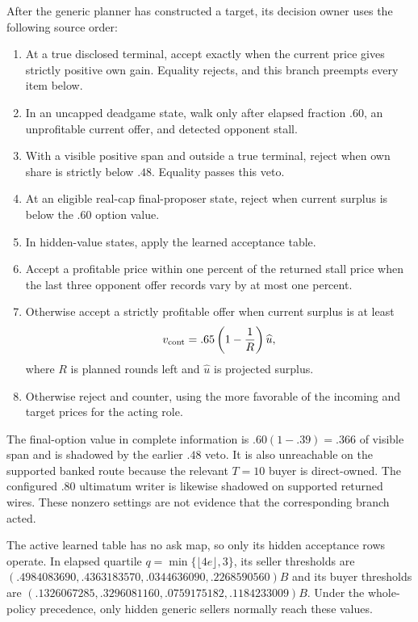 After the generic planner has constructed a target, its decision owner uses
the following source order:
\begin{enumerate}
  \item At a true disclosed terminal, accept exactly when the current price
  gives strictly positive own gain. Equality rejects, and this branch preempts
  every item below.
  \item In an uncapped deadgame state, walk only after elapsed fraction $.60$,
  an unprofitable current offer, and detected opponent stall.
  \item With a visible positive span and outside a true terminal, reject when
  own share is strictly below $.48$. Equality passes this veto.
  \item At an eligible real-cap final-proposer state, reject when current
  surplus is below the $.60$ option value.
  \item In hidden-value states, apply the learned acceptance table.
  \item Accept a profitable price within one percent of the returned stall
  price when the last three opponent offer records vary by at most one percent.
  \item Otherwise accept a strictly profitable offer when current surplus is
  at least
  \begin{equation}
  v_{\rm cont}=.65\left(1-\frac1R\right)\widehat u,
  \label{eq:nego_continuation}
  \end{equation}
  where $R$ is planned rounds left and $\widehat u$ is projected surplus.
  \item Otherwise reject and counter, using the more favorable of the incoming
  and target prices for the acting role.
\end{enumerate}
The final-option value in complete information is
$.60(1-.39)=.366$ of visible span and is shadowed by the earlier $.48$ veto.
It is also unreachable on the supported banked route because the relevant
$T=10$ buyer is direct-owned. The configured $.80$ ultimatum writer is likewise
shadowed on supported returned wires. These nonzero settings are not evidence
that the corresponding branch acted.

The active learned table has no ask map, so only its hidden acceptance rows
operate. In elapsed quartile
$q=\min\{\lfloor4e\rfloor,3\}$, its seller thresholds are
$(.4984083690,.4363183570,.0344636090,.2268590560)B$ and its buyer thresholds
are $(.1326067285,.3296081160,.0759175182,.1184233009)B$. Under the whole-policy
precedence, only hidden generic sellers normally reach these values.

